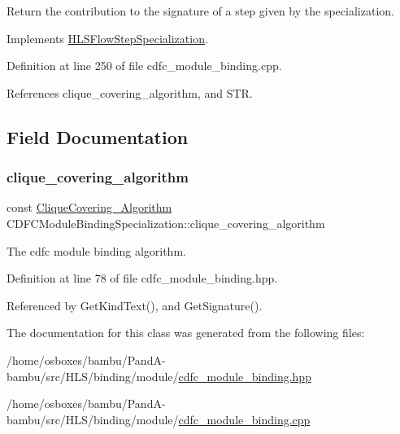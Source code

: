Return the contribution to the signature of a step given by the specialization. 



Implements \hyperlink{classHLSFlowStepSpecialization_ae8c6ce8a3495c93e8a8edc01d8727023}{H\+L\+S\+Flow\+Step\+Specialization}.



Definition at line 250 of file cdfc\+\_\+module\+\_\+binding.\+cpp.



References clique\+\_\+covering\+\_\+algorithm, and S\+TR.



\subsection{Field Documentation}
\mbox{\label{classCDFCModuleBindingSpecialization_a55252a5ffbf6a0bb09c6f5165e04e75e}} 
\subsubsection{\texorpdfstring{clique\+\_\+covering\+\_\+algorithm}{clique\_covering\_algorithm}}
{\footnotesize\ttfamily const \hyperlink{clique__covering_8hpp_acc23ade19dac4d6935b7792353e207d9}{Clique\+Covering\+\_\+\+Algorithm} C\+D\+F\+C\+Module\+Binding\+Specialization\+::clique\+\_\+covering\+\_\+algorithm}



The cdfc module binding algorithm. 



Definition at line 78 of file cdfc\+\_\+module\+\_\+binding.\+hpp.



Referenced by Get\+Kind\+Text(), and Get\+Signature().



The documentation for this class was generated from the following files\+:\begin{DoxyCompactItemize}
\item 
/home/osboxes/bambu/\+Pand\+A-\/bambu/src/\+H\+L\+S/binding/module/\hyperlink{cdfc__module__binding_8hpp}{cdfc\+\_\+module\+\_\+binding.\+hpp}\item 
/home/osboxes/bambu/\+Pand\+A-\/bambu/src/\+H\+L\+S/binding/module/\hyperlink{cdfc__module__binding_8cpp}{cdfc\+\_\+module\+\_\+binding.\+cpp}\end{DoxyCompactItemize}
